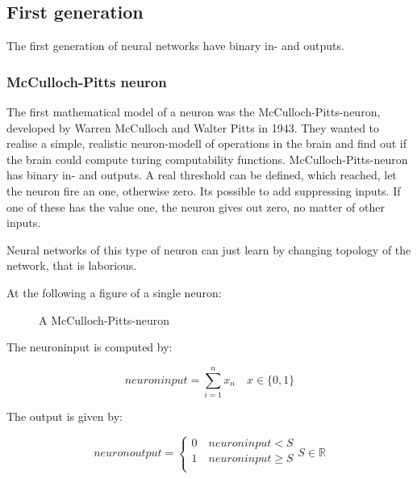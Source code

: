 \documentclass[10pt,a4paper,DIV=11]{scrreprt}
\begin{document}
\subsection{First generation}
The first generation of neural networks have binary in- and outputs.

\subsubsection{McCulloch-Pitts neuron}
The first mathematical model of a neuron was the McCulloch-Pitts-neuron,
developed by Warren McCulloch and Walter Pitts in 1943.
They wanted to realise a simple, realistic neuron-modell of operations in the brain and find out if the brain could compute turing computability functions.
McCulloch-Pitts-neuron has binary in- and outputs.
A real threshold can be defined, which reached, let the neuron fire an one, otherwise zero.
Its possible to add suppressing inputs. If one of these has the value one, the neuron gives out zero, no matter of other inputs.


Neural networks of this type of neuron can just learn by changing topology of the network, that is laborious.

At the following a figure of a single neuron:

\begin{figure}
	\centering
	\caption{A McCulloch-Pitts-neuron}
	\label{fig:pitts1}
\end{figure}
The neuroninput is computed by:

\begin{equation}
	neuroninput = \sum_{i=1}^{n} x_{n} \quad  x \in \{0, 1\}
\end{equation}

The output is given by:

\begin{equation}
	neuronoutput=\begin{cases}
		0 \quad  neuroninput < S \\  %
		1 \quad  neuroninput \geq S \\
	\end{cases}
	S \in \mathbb{R}
\end{equation}
\end{document}
